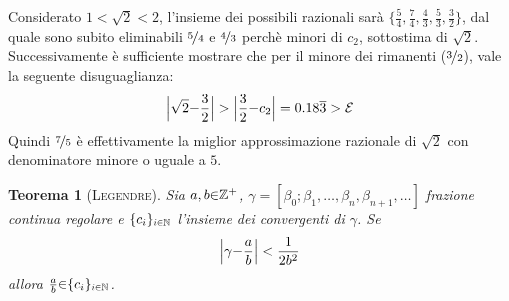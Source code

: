 \documentclass[twoside,symmetric,justified,openany,nobib]{tufte-book}
\def\SP#1{\textsuperscript{#1}}
\newtheorem{thm}{Teorema}
\begin{document}
{Considerato $1{<}\sqrt{2}{<}2$, l'insieme dei possibili razionali sarà $\{ \frac{5}{4},\frac{7}{4},\frac{4}{3},\frac{5}{3},\frac{3}{2} \}$, dal quale sono subito eliminabili $\nicefrac{5}{4}$ e $\nicefrac{4}{3}$ perchè minori di $c_2$, sottostima di $\sqrt{2}$. Successivamente è sufficiente mostrare che per il minore dei rimanenti ($\nicefrac{3}{2}$), vale la seguente disuguaglianza:
\[
  \Bigl|\sqrt{2}{-}\frac{3}{2}\Bigr| > \Bigl|\frac{3}{2}{-}c_2\Bigr| = 0.18\overline{3} > \mathcal{E}
\]
Quindi $\nicefrac{7}{5}$ è effettivamente la miglior approssimazione razionale di $\sqrt{2}$ con denominatore minore o uguale a $5$.}
\begin{thm}[\textsc{Legendre}]
  \label{legendre2}
  Sia $a,b{\in}\mathbb{Z}\SP{+}$, $\gamma{=}[\beta_0;\beta_1,\dots,\beta_n,\beta_{n+1},\dots]$ frazione continua regolare e $\{ c_i \}_{\scalebox{.7}{$i{\in}\mathbb{N}$}}$ l'insieme dei convergenti di $\gamma$. Se
  \begin{equation}
    \label{legendre2-1}
    \Bigl|\gamma{-}\frac{a}{b}\Bigr| < \frac{1}{2b^2}
  \end{equation}
  allora $\frac{a}{b}{\in}\{ c_i \}_{\scalebox{.7}{$i{\in}\mathbb{N}$}}$.
\end{thm}
\end{document}
